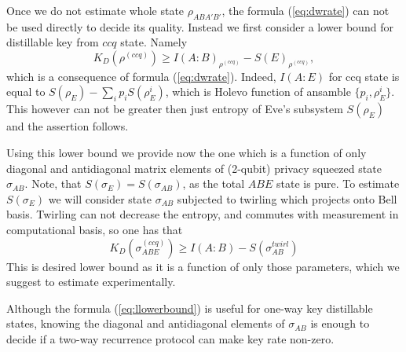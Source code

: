 \documentclass[twocolumn,prl,aps]{revtex4}
\def\be{\begin{equation}}
\def\ee{\end{equation}}
\def\sigmaccqabe{\sigma^{(ccq)}_{ABE}}
\def\sigmaab{\sigma_{AB}}
\def\sigmaabtwirl{\sigma_{AB}^{twirl}}
\def\sigmae{\sigma_E}
\def\sigmaetwirl{\sigma_E^{twirl}}
\begin{document}
Once we do not estimate whole state $\rho_{ABA'B'}$, the formula 
 (\ref{eq:dwrate}) can not be used directly to decide its quality. 
Instead we first consider a lower bound for distillable key from 
$ccq$ state. Namely
\be
K_D(\rho^{(ccq)}) \geq I(A:B)_{\rho^{(ccq)}} - S(E)_{\rho^{(ccq)}},
\ee
which is a consequence of formula (\ref{eq:dwrate}).  
Indeed, $I(A:E)$ for ccq state is 
equal to $S(\rho_E) - \sum_i p_i S(\rho_E^i)$, which is 
Holevo function of ansamble $\{p_i,\rho_E^i\}$. This however can not 
be greater then just entropy of Eve's subsystem $S(\rho_E)$ 
and the assertion follows.

Using this lower bound we provide now the one which is a function of 
only diagonal and antidiagonal matrix elements 
of (2-qubit) privacy squeezed state $\sigmaab$.
Note, that $S(\sigmae) = S(\sigmaab)$, as the total $ABE$ state is pure.
To estimate $S(\sigma_E)$ we will consider state $\sigmaab$ subjected to 
twirling \cite{BBPSSW1996}  which projects onto Bell basis. Twirling can not 
decrease the entropy, and commutes with  measurement in computational basis, so one has that 
\be
K_D(\sigmaccqabe) \geq I(A:B) - S(\sigmaabtwirl)
\label{eq:llowerbound}
\ee
This is desired lower bound as it
is a function of only those parameters, which we suggest to  
estimate experimentally.

Although the formula (\ref{eq:llowerbound}) is useful for
one-way key distillable states, knowing the diagonal and antidiagonal
elements of $\sigma_{AB}$ is enough to decide if a two-way recurrence 
protocol can make key rate non-zero. 
 
\end{document}
